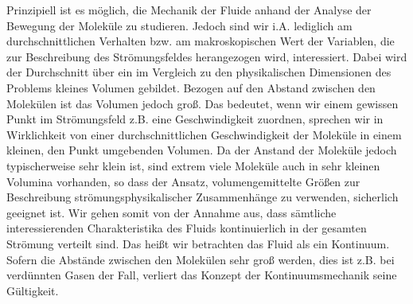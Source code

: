 \documentclass{lecture}
\begin{document}
    Prinzipiell ist es möglich, die Mechanik der Fluide anhand der Analyse der Bewegung der Moleküle zu studieren.
    Jedoch sind wir i.A. lediglich am durchschnittlichen Verhalten bzw. am makroskopischen Wert der Variablen, die zur Beschreibung des Strömungsfeldes herangezogen wird, interessiert.
    Dabei wird der Durchschnitt über ein im Vergleich zu den physikalischen Dimensionen des Problems kleines Volumen gebildet.
    Bezogen auf den Abstand zwischen den Molekülen ist das Volumen jedoch groß.
    Das bedeutet, wenn wir einem gewissen Punkt im Strömungsfeld z.B. eine Geschwindigkeit zuordnen, sprechen wir in Wirklichkeit von einer durchschnittlichen Geschwindigkeit der Moleküle in einem kleinen, den Punkt umgebenden Volumen.
    Da der Anstand der Moleküle jedoch typischerweise sehr klein ist, sind extrem viele Moleküle auch in sehr kleinen Volumina vorhanden, so dass der Ansatz, volumengemittelte Größen zur Beschreibung strömungsphysikalischer Zusammenhänge zu verwenden, sicherlich geeignet ist.
    Wir gehen somit von der Annahme aus, dass sämtliche interessierenden Charakteristika des Fluids kontinuierlich in der gesamten Strömung verteilt sind.
    Das heißt wir betrachten das Fluid als ein Kontinuum.
    Sofern die Abstände zwischen den Molekülen sehr groß werden, dies ist z.B. bei verdünnten Gasen der Fall, verliert das Konzept der Kontinuumsmechanik seine Gültigkeit.
\end{document}
